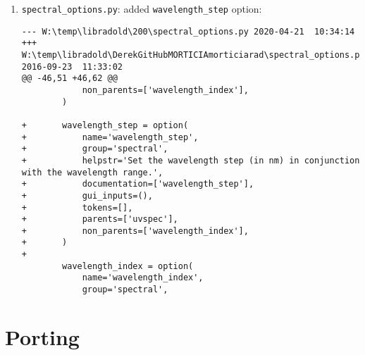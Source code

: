 \begin{enumerate}
\begin{lstlisting}
 	def __iter__(self):
 		return iter(self.options)
@@ -493,498 +515,536 @@
 	\fcode{
 	   aerosol\_set\_tau\_at\_wvl lambda tau
 	}
+		''',
+
+        'aerosol_sizedist_file': r'''
+        Calculate optical properties from size distribution and index of refraction using Mie
+        theory. Here is an exception from the rule that ALL values defined above are overwritten
+        because the optical thickness profile is re-scaled so that the optical thickness
+        at the first internal wavelength is unchanged. It is done that way to give the user an
+        easy means of specifying the optical thickness at a given wavelength.
+        ''',
+
+        'aerosol_refrac_index': r'''
+        Calculate optical properties from size distribution and index of refraction using Mie
+        theory. Here is an exception from the rule that ALL values defined above are overwritten
+        because the optical thickness profile is re-scaled so that the optical thickness
+        at the first internal wavelength is unchanged. It is done that way to give the user an
+        easy means of specifying the optical thickness at a given wavelength.
 		''',
 }
\end{lstlisting}
 


\item \lstinline{spectral_options.py}: added \lstinline{wavelength_step} option:

\begin{lstlisting}
--- W:\temp\libradold\200\spectral_options.py 2020-04-21  10:34:14
+++ W:\temp\libradold\DerekGitHubMORTICIAmorticiarad\spectral_options.py 2016-09-23  11:33:02
@@ -46,51 +46,62 @@
 			non_parents=['wavelength_index'],
 		)
 
+		wavelength_step = option(
+			name='wavelength_step',
+			group='spectral',
+			helpstr='Set the wavelength step (in nm) in conjunction with the wavelength range.',
+			documentation=['wavelength_step'],
+			gui_inputs=(),
+			tokens=[],
+			parents=['uvspec'],
+			non_parents=['wavelength_index'],
+		)
+
 		wavelength_index = option(
 			name='wavelength_index',
 			group='spectral',
\end{lstlisting}
\end{enumerate}



\section{Porting}
\label{sec:Portingscr_pytoPython3}

